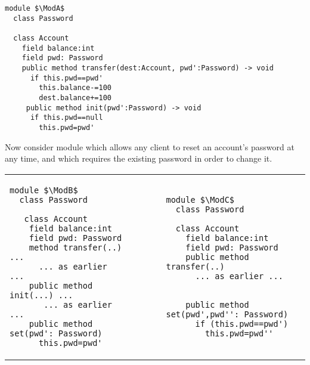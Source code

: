 \begin{lstlisting}[mathescape=true, language=Chainmail, frame=lines]
module $\ModA$        
  class Password
  
  class Account
    field balance:int 
    field pwd: Password
    public method transfer(dest:Account, pwd':Password) -> void
      if this.pwd==pwd'
        this.balance-=100
        dest.balance+=100
     public method init(pwd':Password) -> void
      if this.pwd==null
        this.pwd=pwd'
\end{lstlisting}
%
\noindent 
%
 
 \vspace{.1cm}
 
Now consider  module \ModB which allows any client to reset an account's password at any time, and \ModC which requires the existing password in order to change it.
  
  

\begin{tabular}{lll}
\begin{minipage}[b]{0.42\textwidth}
\begin{lstlisting}[mathescape=true, language=chainmail, frame=lines]
module $\ModB$
  class Password
  
   class Account
    field balance:int 
    field pwd: Password 
    method transfer(..) ...
      ... as earlier ...
    public method init(...) ...
       ... as earlier ...
    public method set(pwd': Password)
      this.pwd=pwd'
\end{lstlisting}
\end{minipage}
&\ \ \  \ \   &%
\begin{minipage}[b]{0.45\textwidth}
\begin{lstlisting}[mathescape=true, language=chainmail, frame=lines]
module $\ModC$
  class Password

  class Account
    field balance:int 
    field pwd: Password 
    public method transfer(..) 
      ... as earlier ...

   
    public method set(pwd',pwd'': Password)
      if (this.pwd==pwd') 
        this.pwd=pwd''
\end{lstlisting}
\end{minipage} 
\end{tabular}

